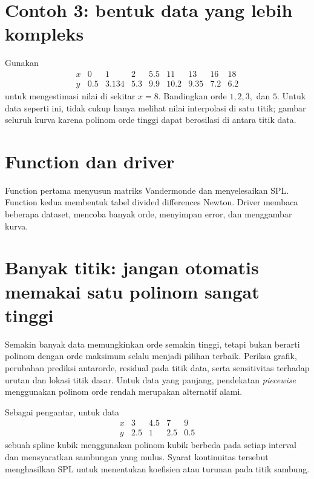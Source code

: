 \section{Contoh 3: bentuk data yang lebih kompleks}
Gunakan
\[
\begin{array}{c|rrrrrrrr}
x&0&1&2&5.5&11&13&16&18\\\hline
y&0.5&3.134&5.3&9.9&10.2&9.35&7.2&6.2
\end{array}
\]
untuk mengestimasi nilai di sekitar $x=8$. Bandingkan orde $1,2,3,$ dan $5$. Untuk data seperti ini, tidak cukup hanya melihat nilai interpolasi di satu titik; gambar seluruh kurva karena polinom orde tinggi dapat berosilasi di antara titik data.

\section{Function dan driver}
Function pertama menyusun matriks Vandermonde dan menyelesaikan SPL. Function kedua membentuk tabel divided differences Newton. Driver membaca beberapa dataset, mencoba banyak orde, menyimpan error, dan menggambar kurva.







\section{Banyak titik: jangan otomatis memakai satu polinom sangat tinggi}
Semakin banyak data memungkinkan orde semakin tinggi, tetapi bukan berarti polinom dengan orde maksimum selalu menjadi pilihan terbaik. Periksa grafik, perubahan prediksi antarorde, residual pada titik data, serta sensitivitas terhadap urutan dan lokasi titik dasar. Untuk data yang panjang, pendekatan \textit{piecewise} menggunakan polinom orde rendah merupakan alternatif alami.

Sebagai pengantar, untuk data
\[
\begin{array}{c|rrrr}
x&3&4.5&7&9\\\hline
y&2.5&1&2.5&0.5
\end{array}
\]
sebuah spline kubik menggunakan polinom kubik berbeda pada setiap interval dan mensyaratkan sambungan yang mulus. Syarat kontinuitas tersebut menghasilkan SPL untuk menentukan koefisien atau turunan pada titik sambung.

